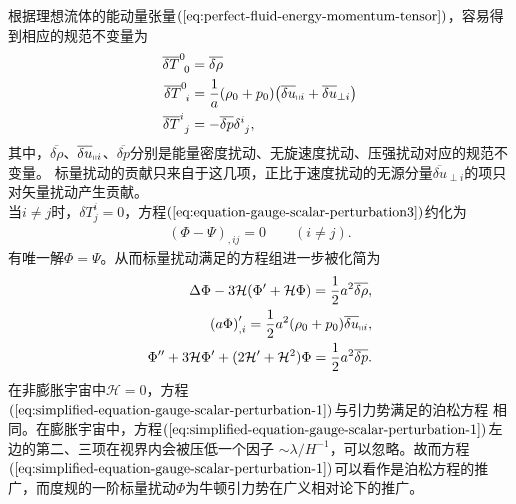 根据理想流体的能动量张量$(\ref{eq:perfect-fluid-energy-momentum-tensor})$，容易得到相应的规范不变量为
\begin{align}
  \label{eq:perfect-fluid-gauge-invariant-variable}
  \overline{\delta{T}}^{0}_{\ 0} &= \overline{\delta{\rho}} \\
  \overline{\delta{T}}^{0}_{\ i} &=
  \frac{1}{a}(\rho_0+p_0){\left(\overline{\delta{u}}_{\shortparallel
        i}+\overline{\delta{u}}_{\perp i}\right)} \\
  \overline{\delta{T}}^{i}_{\ j}&= -\overline{\delta{p}}\delta^{i}_{\ j},
\end{align}
其中，$\overline{\delta{\rho}}$、$\overline{\delta{u}}_{\shortparallel
i}$、$\overline{\delta{p}}$分别是能量密度扰动、无旋速度扰动、压强扰动对应的规范不变量。
标量扰动的贡献只来自于这几项，正比于速度扰动的无源分量$\overline{\delta{u}}_{\perp
i}$的项只对矢量扰动产生贡献。\\
当$i\neq
j$时，$\delta{T}^{i}_{j}=0$，方程$(\ref{eq:equation-gauge-scalar-perturbation3})$约化为
\begin{align}
  {\left(\Phi-\Psi\right)}_{,ij}=0\qquad (i\neq j).
\end{align}
有唯一解$\Phi=\Psi$。从而标量扰动满足的方程组进一步被化简为
\begin{align}
  \Delta \Phi -3\mathcal{H}{\left(\Phi^\prime+\mathcal{H}\Phi\right)} =
  \frac{1}{2}a^2\overline{\delta{\rho}},
  \label{eq:simplified-equation-gauge-scalar-perturbation-1} \\
  {\left(a\Phi\right)}^{\prime}_{,i}=\frac{1}{2}
  a^2{\left(\rho_0+p_0\right)}\overline{\delta{u}}_{\shortparallel i},
  \label{eq:simplified-equation-gauge-scalar-perturbation-2} \\
  \Phi^{\prime\prime}+3\mathcal{H}\Phi^\prime+(2\mathcal{H}^{\prime}+\mathcal{H}^2)\Phi=
  \frac{1}{2}a^2\overline{\delta{p}}.
  \label{eq:simplified-equation-gauge-scalar-perturbation-3}
\end{align}
在非膨胀宇宙中$\mathcal{H}=0$，方程$(\ref{eq:simplified-equation-gauge-scalar-perturbation-1})$与引力势满足的泊松方程
相同。在膨胀宇宙中，方程$(\ref{eq:simplified-equation-gauge-scalar-perturbation-1})$左边的第二、三项在视界内会被压低一个因子
$\sim\lambda
/H^{-1}$，可以忽略。故而方程$(\ref{eq:simplified-equation-gauge-scalar-perturbation-1})$可以看作是泊松方程的推广，而度规的一阶标量扰动$\Phi$为牛顿引力势在广义相对论下的推广。

